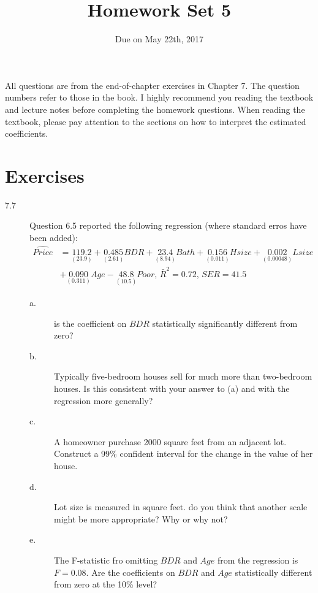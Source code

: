 \documentclass[a4paper,11pt]{article}
\date{Due on May 22th, 2017}
\title{Homework Set 5}
\begin{document}
\maketitle
All questions are from the end-of-chapter exercises in Chapter 7. The question
numbers refer to those in the book. I highly recommend you reading the
textbook and lecture notes before completing the homework
questions. When reading the textbook, please pay attention to the
sections on how to interpret the estimated coefficients.

\section*{Exercises}
\label{sec:org64a5d87}

\begin{description}
\item[{7.7}] Question 6.5 reported the following regression (where
standard erros have been added): 
\begin{equation*}
\begin{split}
\widehat{Price} &= \underset{(23.9)}{119.2} + \underset{(2.61)}{0.485}BDR + \underset{(8.94)}{23.4}Bath + \underset{(0.011)}{0.156} Hsize + \underset{(0.00048)}{0.002}Lsize \\
&+ \underset{(0.311)}{0.090} Age - \underset{(10.5)}{48.8}Poor,\, \bar{R}^2 = 0.72,\, SER = 41.5
\end{split}
\end{equation*}
\begin{description}
\item[{a.}] is the coefficient on \(BDR\) statistically significantly
different from zero?
\item[{b.}] Typically five-bedroom houses sell for much more than
two-bedroom houses. Is this consistent with your answer to
(a) and with the regression more generally?
\item[{c.}] A homeowner purchase 2000 square feet from an adjacent
lot. Construct a 99\% confident interval for the change in
the value of her house.
\item[{d.}] Lot size is measured in square feet. do you think that
another scale might be more appropriate? Why or why not?
\item[{e.}] The F-statistic fro omitting \(BDR\) and \(Age\) from the
regression is \(F = 0.08\). Are the coefficients on \(BDR\) and
\(Age\) statistically different from zero at the 10\% level?
\end{description}
\end{description}
\end{document}
